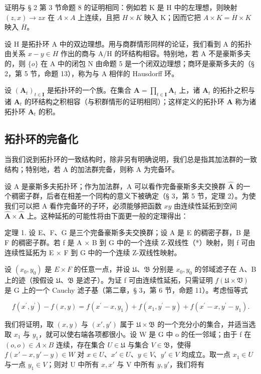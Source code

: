 证明与 § 2 第 3 节命题 8 的证明相同：例如若 K 是 H 中的左理想，则映射 \((z, x) \to zx\) 在 \(A \times A\) 上连续，且把 \(H \times K\) 映入 K；因而它把 \(A \times K = \overline{H} \times K\) 映入 \(\overline{H}\)。

设 H 是拓扑环 A 中的双边理想。用与商群情形同样的论证，我们看到 A 的拓扑由关系 \(x - y \in H\) 作出的商与 A/H 的环结构相容。特别地，若 A 不是豪斯多夫的，则 \(\{o\}\) 在 A 中的闭包 N 由命题 5 是一个闭双边理想；商环是豪斯多夫的（§ 2，第 5 节，命题 13），称为与 A 相伴的 Hausdorff 环。

设 \((\mathbf{A}_t)_{t\in \mathbf{I}}\) 是拓扑环的一个族。在集合 \(\mathbf{A} = \prod_{t\in \mathbf{I}}\mathbf{A}_t\) 上，诸 \(\mathbf{A}_t\) 的拓扑之积与诸 \(\mathbf{A}_t\) 的环结构之积相容（与积群情形的证明相同）；这样定义的拓扑环 \(\mathbf{A}\) 称为诸拓扑环 \(\mathbf{A}_t\) 的积。

\subsection{拓扑环的完备化}

当我们说到拓扑环的一致结构时，除非另有明确说明，我们总是指其加法群的一致结构；特别地，若 A 的加法群完备，则称 A 为完备环。

设 A 是豪斯多夫拓扑环；作为加法群，A 可以看作完备豪斯多夫交换群 \(\hat{\mathbf{A}}\) 的一个稠密子群，后者在相差一个同构的意义下被确定（§ 3，第 5 节，定理 2）。为使我们可以把 A 看作完备环的子环，必须能够把函数 \(xy\) 由连续性延拓到空间 \(\hat{\mathbf{A}} \times \hat{\mathbf{A}}\) 上。这种延拓的可能性将由下面更一般的定理得出：

定理 1. 设 E、F、G 是三个完备豪斯多夫交换群；设 A 是 E 的稠密子群，B 是 F 的稠密子群。若 f 是 A × B 到 G 中的一个连续 Z-双线性（*）映射，则 f 可由连续性延拓为 E × F 到 G 中的一个连续 Z-双线性映射。

设 \((x_{0}, y_{0})\) 是 \(E \times F\) 的任意一点，并设 \(\mathfrak{U}\)、\(\mathfrak{B}\) 分别是 \(x_{0}, y_{0}\) 的邻域滤子在 A、B 上的迹（按假设 \(\mathfrak{U}\)、\(\mathfrak{B}\) 是滤子）。为证 f 可由连续性延拓，只需证明 \(f(\mathfrak{U} \times \mathfrak{V})\) 是 G 上的一个 Cauchy 滤子基（第二章，§ 3，第 6 节，命题 11）。考虑恒等式

\[
f \left(x ^ {\prime}, y ^ {\prime}\right) - f (x, y) = f \left(x ^ {\prime} - x, y _ {1}\right) + f \left(x _ {1}, y ^ {\prime} - y\right) + f \left(x ^ {\prime} - x, y ^ {\prime} - y _ {1}\right).
\]

我们将证明，取 \((x, y)\) 与 \((x', y')\) 属于 \(\mathfrak{U} \times \mathfrak{B}\) 的一个充分小的集合，并适当选取 \(x_{1}\) 与 \(y_{1}\)，就可以使右端各项都很小。设 W 是 G 中 o 的任一邻域；由于 f 在 \((o, o) \in A \times B\) 连续，存在集合 \(U \in \mathfrak{U}\) 与集合 \(V \in \mathfrak{B}\)，使得 \(f(x' - x, y' - y) \in W\) 对 \(x \in U\)、\(x' \in U\)、\(y \in V\)、\(y' \in V\) 均成立。取一点 \(x_{1} \in U\) 与一点 \(y_{1} \in V\)；则对 U 中所有 \(x, x'\) 与 V 中所有 \(y, y'\)，我们将有

